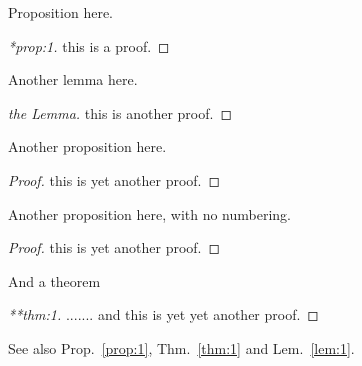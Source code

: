 \documentclass[12pt,a5paper]{article}
\begin{document}
\begin{prop}
  \label{prop:1}
  Proposition here.
\end{prop}
\begin{proof}[*prop:1]
  this is a proof.
\end{proof}

\bigskip

\begin{lem}
\label{lem:1}
Another lemma here.
\end{lem}
\begin{proof}[the Lemma]
  this is another proof.
\end{proof}

\bigskip

\begin{prop}
Another proposition here.
\end{prop}
\begin{proof}
  this is yet another proof.
\end{proof}

\bigskip

\begin{prop*}
Another proposition here, with no numbering.
\end{prop*}
\begin{proof}
  this is yet another proof.
\end{proof}

\bigskip

\begin{thm}
\label{thm:1}
And a theorem
\end{thm}
\begin{proof}[**thm:1]
  ....... and  this is yet yet another proof.
\end{proof}

\bigskip

See also Prop.~\ref{prop:1}, Thm.~\ref{thm:1} and Lem.~\ref{lem:1}.
\end{document}
